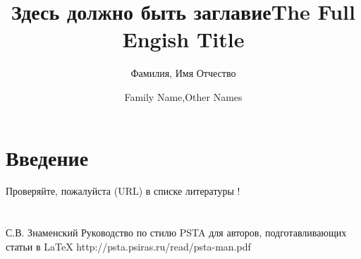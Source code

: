\documentclass[utf8]{psta}%
\title[кратко]{Здесь должно быть заглавие}
\author{Фамилия, Имя Отчество}
\title[Short title]{The Full Engish Title}
\author{Family Name,Other Names}
\begin{document}
           
\maketitle   
\section*{Введение}
Проверяйте, пожалуйста (URL) в списке литературы \cite{PSTAmanual}!%
\section{}
\subsection{}


% 
\begin{thebibliography}{30}
%
%
%
\by С.В. Знаменский
\preprint Руководство по стилю PSTA для авторов, подготавливающих статьи в \LaTeX
{} 
\URL http://psta.psiras.ru/read/psta-man.pdf

\end{thebibliography}
\end{document}
